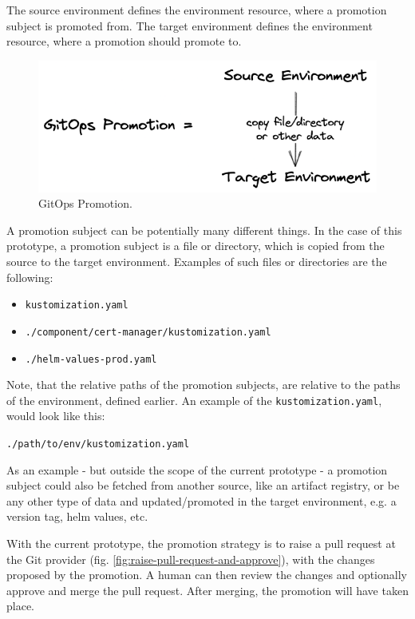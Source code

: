 The source environment defines the environment resource,
where a promotion subject is promoted from.
The target environment defines the environment resource,
where a promotion should promote to.

\begin{figure}[h]
	\centering
	\includegraphics[width=1.00\linewidth]{assets/gitops-promo.png}
	\caption{GitOps Promotion.
	}
	\label{fig:gitops-promo}	
\end{figure}

A promotion subject can be potentially many different things.
In the case of this prototype,
a promotion subject is a file or directory,
which is copied from the source to the target environment.
Examples of such files or directories are the following:

\begin{itemize}
	\item \lstinline|kustomization.yaml|
	\item \lstinline|./component/cert-manager/kustomization.yaml|
	\item \lstinline|./helm-values-prod.yaml|
\end{itemize}

Note, that the relative paths of the promotion subjects,
are relative to the paths of the environment, defined earlier.
An example of the \lstinline|kustomization.yaml|, would look like this:

\lstinline|./path/to/env/kustomization.yaml|

As an example - but outside the scope of the current prototype -
a promotion subject could also be fetched from another source,
like an artifact registry, or be any other type of data
and updated/promoted in the target environment,
e.g. a version tag, helm values, etc.

With the current prototype,
the promotion strategy is to raise a pull request at the Git provider
(fig. \ref{fig:raise-pull-request-and-approve}),
with the changes proposed by the promotion.
A human can then review the changes and optionally approve and merge the pull request.
After merging, the promotion will have taken place.

